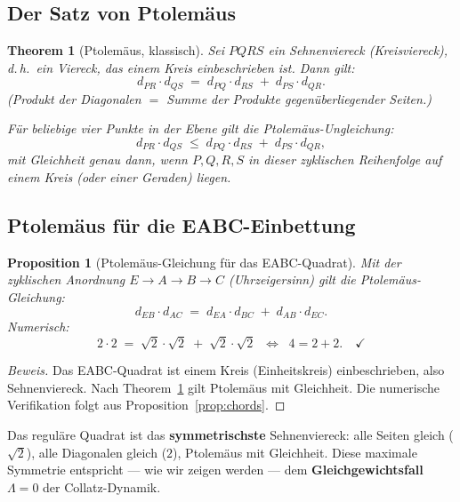 \documentclass[12pt,a4paper]{article}
\newtheorem{proposition}[definition]{Proposition}
\newtheorem{theorem}[definition]{Theorem}
\newenvironment{beweis}{\begin{proof}[Beweis]}{\end{proof}}
\newcommand{\chord}[2]{d_{#1#2}}   %
\begin{document}
\subsection{Der Satz von Ptolemäus}

\begin{theorem}[Ptolemäus, klassisch]
\label{thm:ptolemaeus-klassisch}
Sei $PQRS$ ein \emph{Sehnenviereck} (Kreisviereck), d.\,h.\ ein Viereck,
das einem Kreis einbeschrieben ist. Dann gilt:
\[
  \chord{P}{R} \cdot \chord{Q}{S}
  \;=\; \chord{P}{Q} \cdot \chord{R}{S} \;+\; \chord{P}{S} \cdot \chord{Q}{R}.
\]
\textup{(Produkt der Diagonalen $=$ Summe der Produkte gegenüberliegender Seiten.)}

Für beliebige vier Punkte in der Ebene gilt die \emph{Ptolemäus-Ungleichung}:
\[
  \chord{P}{R} \cdot \chord{Q}{S}
  \;\leq\; \chord{P}{Q} \cdot \chord{R}{S} \;+\; \chord{P}{S} \cdot \chord{Q}{R},
\]
mit Gleichheit genau dann, wenn $P, Q, R, S$ in dieser zyklischen Reihenfolge
auf einem Kreis (oder einer Geraden) liegen.
\end{theorem}

\subsection{Ptolemäus für die EABC-Einbettung}

\begin{proposition}[Ptolemäus-Gleichung für das EABC-Quadrat]
\label{prop:ptol-eabc}
Mit der zyklischen Anordnung $E \to A \to B \to C$ (Uhrzeigersinn) gilt
die Ptolemäus-Gleichung:
\[
  \chord{E}{B} \cdot \chord{A}{C}
  \;=\;
  \chord{E}{A} \cdot \chord{B}{C} \;+\; \chord{A}{B} \cdot \chord{E}{C}.
\]
Numerisch:
\[
  2 \cdot 2 \;=\; \sqrt{2} \cdot \sqrt{2} \;+\; \sqrt{2} \cdot \sqrt{2}
  \;\;\Longleftrightarrow\;\; 4 = 2 + 2. \quad\checkmark
\]
\end{proposition}

\begin{beweis}
Das EABC-Quadrat ist einem Kreis (Einheitskreis) einbeschrieben, also
Sehnenviereck. Nach Theorem~\ref{thm:ptolemaeus-klassisch} gilt Ptolemäus
mit Gleichheit. Die numerische Verifikation folgt aus
Proposition~\ref{prop:chords}.
\end{beweis}

\begin{tcolorbox}[ptolstil]
Das reguläre Quadrat ist das \textbf{symmetrischste} Sehnenviereck: alle
Seiten gleich ($\sqrt{2}$), alle Diagonalen gleich ($2$), Ptolemäus mit
Gleichheit. Diese maximale Symmetrie entspricht --- wie wir zeigen werden ---
dem \textbf{Gleichgewichtsfall} $\Lambda = 0$ der Collatz-Dynamik.
\end{tcolorbox}
\end{document}
